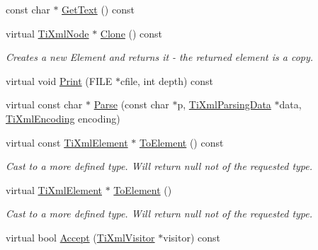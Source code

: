 \begin{DoxyCompactItemize}
\item 
const char $\ast$ \hyperlink{class_ti_xml_element_af0f814ecbd43d50d4cdbdf4354d3da39}{Get\+Text} () const
\item 
virtual \hyperlink{class_ti_xml_node}{Ti\+Xml\+Node} $\ast$ \hyperlink{class_ti_xml_element_a810ea8fa40844c01334e5af2a26794cb}{Clone} () const
\begin{DoxyCompactList}\small\item\em Creates a new Element and returns it -\/ the returned element is a copy. \end{DoxyCompactList}\item 
virtual void \hyperlink{class_ti_xml_element_aa31a15cddfb8601a31236fe7d2569fb4}{Print} (F\+I\+LE $\ast$cfile, int depth) const
\item 
virtual const char $\ast$ \hyperlink{class_ti_xml_element_af95c9165159fd9dfdcc5b894a3fcf85b}{Parse} (const char $\ast$p, \hyperlink{class_ti_xml_parsing_data}{Ti\+Xml\+Parsing\+Data} $\ast$data, \hyperlink{tinyxml_8h_a88d51847a13ee0f4b4d320d03d2c4d96}{Ti\+Xml\+Encoding} encoding)
\item 
virtual const \hyperlink{class_ti_xml_element}{Ti\+Xml\+Element} $\ast$ \hyperlink{class_ti_xml_element_a940fc8aa953e0ef0de6e110b7d98b8ee}{To\+Element} () const
\begin{DoxyCompactList}\small\item\em Cast to a more defined type. Will return null not of the requested type. \end{DoxyCompactList}\item 
virtual \hyperlink{class_ti_xml_element}{Ti\+Xml\+Element} $\ast$ \hyperlink{class_ti_xml_element_a9def86337ea7a755eb41cac980f60c7a}{To\+Element} ()
\begin{DoxyCompactList}\small\item\em Cast to a more defined type. Will return null not of the requested type. \end{DoxyCompactList}\item 
virtual bool \hyperlink{class_ti_xml_element_a01d33358cce9d1817b557d314dda3779}{Accept} (\hyperlink{class_ti_xml_visitor}{Ti\+Xml\+Visitor} $\ast$visitor) const
\end{DoxyCompactItemize}
